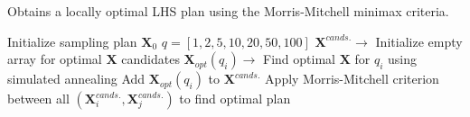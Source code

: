 \begin{algorithm}
\caption{\label{code:best_lhs} 
Obtains a locally optimal \ac{LHS} plan using the Morris-Mitchell minimax criteria.} 
\begin{algorithmic}[1]
\State Initialize sampling plan $\textbf{X}_0$ 
\State $q = \left[1, 2, 5, 10, 20, 50, 100\right]$
\State $\textbf{X}^{cands.} \rightarrow$ Initialize empty array for optimal $\textbf{X}$ candidates
   \State $\textbf{X}_{opt}(q_i)\rightarrow$ Find optimal $\textbf{X}$ for $q_i$ using simulated annealing 
   \State Add $\textbf{X}_{opt}(q_i)$ to $\textbf{X}^{cands.}$ 
\EndFor
\State Apply Morris-Mitchell criterion between all $(\textbf{X}^{cands.}_i, \textbf{X}^{cands.}_j)$ to find optimal plan
\end{algorithmic}
\end{algorithm}
  


 

